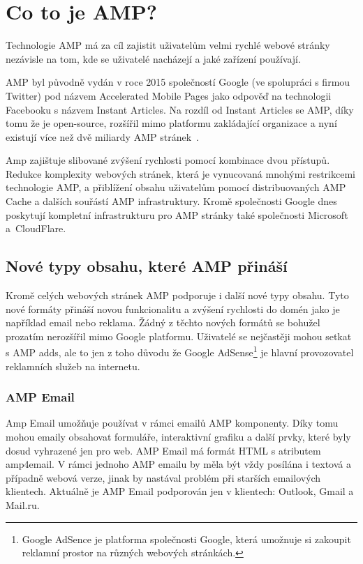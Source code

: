 \chapter{Co to je AMP?}
\label{AMP}
Technologie AMP má za cíl zajistit uživatelům velmi rychlé webové stránky nezávisle na tom, kde se
uživatelé nacházejí a jaké zařízení používají.

AMP byl původně vydán v roce 2015 společností Google (ve spolupráci s firmou Twitter) pod názvem Accelerated Mobile Pages jako odpověď
na technologii Facebooku s názvem Instant Articles. Na rozdíl od Instant Articles se AMP, díky tomu že je
open-source, rozšířil mimo platformu zakládající organizace a nyní existují více než dvě miliardy AMP
stránek~\cite{AMPTurbo}.

Amp zajištuje slibované zvýšení rychlosti pomocí kombinace dvou přístupů. Redukce komplexity webových stránek, která je vynucovaná mnohými restrikcemi technologie AMP, a přiblížení obsahu uživatelům pomocí distribuovaných AMP Cache a dalších souřástí AMP infrastruktury. Kromě společnosti Google dnes poskytují kompletní infrastrukturu pro AMP stránky také
společnosti Microsoft a~CloudFlare.

\section{Nové typy obsahu, které AMP přináší}
Kromě celých webových stránek AMP podporuje i další nové typy obsahu. Tyto nové formáty přináší novou funkcionalitu a zvýšení rychlosti do domén jako je například email nebo reklama. Žádný z těchto nových formátů se bohužel prozatím nerozšířil mimo Google platformu. Uživatelé se nejčastěji mohou setkat s AMP adds, ale to jen z toho důvodu že Google AdSense\footnote{Google AdSence je platforma společnosti Google, která umožnuje si zakoupit reklamní prostor na různých webových stránkách.} je hlavní provozovatel reklamních služeb na internetu.
\subsection*{AMP Email}
Amp Email umožňuje používat v rámci emailů AMP komponenty. Díky tomu mohou emaily obsahovat formuláře, interaktivní grafiku a další prvky, které byly dosud vyhrazené jen pro web. AMP Email má formát HTML s atributem amp4email. V rámci jednoho AMP emailu by měla být vždy posílána i textová a případně webová verze, jinak by nastával problém při starších emailových klientech\cite[Ch.\ 6, p.\ 285]{VzhuruDoAMP}.
Aktuálně je AMP Email podporován jen v klientech:
Outlook, Gmail a Mail.ru\cite{EmailSupport}.

